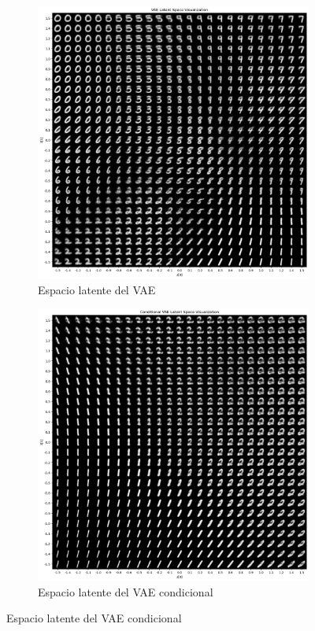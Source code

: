 \documentclass[11pt]{article}
\begin{document}
\begin{figure}[h]
\begin{subfigure}[h]{0.5\linewidth}
    \centering
    \includegraphics[width=\linewidth]{VAE/latent_space_vae.png}
    \caption{Espacio latente del VAE}
    \label{fig:vae_latent_space}
\end{subfigure}
\begin{subfigure}[h]{0.5\linewidth}
    \centering
    \includegraphics[width=\linewidth]{VAE/latent_space_cvae.png}
    \caption{Espacio latente del VAE condicional}
    \label{fig:cvae_latent_space}
\end{subfigure}
\end{figure}
\end{document}
